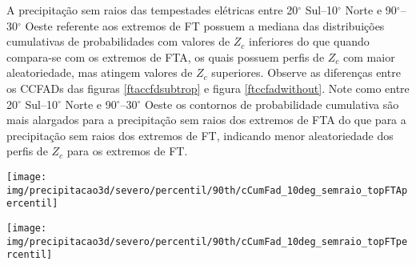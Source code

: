 
A precipitação sem raios das tempestades elétricas entre 20$^{\circ}$ Sul--10$^{\circ}$ Norte e 90$^{\circ}$--30$^{\circ}$ Oeste referente aos extremos de FT possuem a mediana das distribuições cumulativas de probabilidades com valores de $Z_c$  inferiores do que quando compara-se com os extremos de FTA, os quais possuem perfis de $Z_c$ com maior aleatoriedade, mas atingem valores de $Z_c$ superiores. Observe as diferenças entre os CCFADs das figuras \ref{ftaccfdsubtrop} e figura \ref{ftccfadwithout}. Note como entre 20$^{\circ}$ Sul--10$^{\circ}$ Norte e 90$^{\circ}$--30$^{\circ}$ Oeste os contornos de probabilidade cumulativa são mais alargados para a precipitação sem raios dos extremos de FTA do que para a precipitação sem raios dos extremos de FT, indicando menor aleatoriedade dos perfis de $Z_c$ para os extremos de FT.

\begin{sidewaysfigure}%
  \centering
  \texttt{[image: img/precipitacao3d/severo/percentil/90th/cCumFad\_10deg\_semraio\_topFTApercentil]}
  \caption{CCFDs para os extremos de FTA. Porção da precipitação sem raios.}
  \label{ftaccfdsubtrop}   
\end{sidewaysfigure} 

\begin{sidewaysfigure}%
  \centering
  \texttt{[image: img/precipitacao3d/severo/percentil/90th/cCumFad\_10deg\_semraio\_topFTpercentil]}
  \caption{CCFDs para os extremos de FT. Porção da precipitação sem raios.}
  \label{ftccfadwithout}   
\end{sidewaysfigure} 


